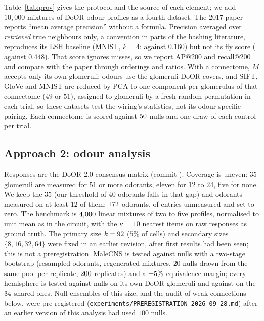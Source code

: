 \documentclass[conference]{IEEEtran}
\begin{document}
Table~\ref{tab:prov} gives the protocol and the source of each element; we add
$10{,}000$ mixtures of DoOR odour profiles as a fourth dataset. The 2017 paper
reports ``mean average precision'' without a formula. Precision averaged over
\emph{retrieved} true neighbours only, a convention in parts of the hashing
literature, reproduces its LSH baseline (MNIST, $k=4$: \ReplMnistLshRetr{}
against $0.160$) but not its fly score (\ReplMnistFlyRetr{} against $0.448$).
That score ignores misses, so we report AP@200 and recall@200 and compare with
the paper through orderings and ratios. With a connectome, $M$ accepts only its
own glomeruli: odours use the glomeruli DoOR covers, and SIFT, GloVe and MNIST
are reduced by PCA to one component per glomerulus of that connectome ($49$ or
$51$), assigned to glomeruli by a fresh random permutation in each trial, so these datasets test the wiring's
statistics, not its odour-specific pairing. Each connectome is scored against
$50$ nulls and one draw of each control per trial.

\subsection{Approach 2: odour analysis}
\label{sec:odours}

Responses are the DoOR 2.0 consensus matrix \cite{munch2016} (commit
\texttt{\DoorCommit}). Coverage is uneven: $35$ glomeruli are measured for $51$
or more odorants, eleven for $12$ to $24$, five for none. We keep the $35$ (our
threshold of $40$ odorants falls in that gap) and odorants measured on at least
$12$ of them: $172$ odorants, \MissingPct{} of entries unmeasured and set
to zero. The benchmark is $4{,}000$ linear mixtures of two to five profiles,
normalised to unit mean as in the circuit, with the $\kappa=10$ nearest items
on raw responses as ground truth. The primary size $k=92$ ($5\%$ of
cells) and secondary sizes $\{8,16,32,64\}$ were fixed in an earlier revision,
after first results had been seen; this is not a preregistration. MaleCNS is
tested against \NullB{} nulls with a two-stage bootstrap (resampled odorants,
regenerated mixtures, $20$ nulls drawn from the same pool per replicate,
$200$ replicates) and a $\pm5\%$ equivalence margin; every
hemisphere is tested against \AnimBOdour{} nulls on its own DoOR glomeruli and
against \AnimB{} on the $34$ shared ones. Null ensembles of this
size, and the audit of weak connections below, were pre-registered
(\texttt{experiments/PREREGISTRATION\_2026-09-28.md}) after an earlier
version of this analysis had used $100$ nulls.
\end{document}
